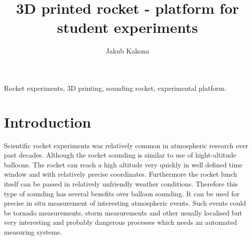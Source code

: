 \documentclass{poster16}
\begin{document}

%
\title{3D printed rocket - platform for student experiments}
%

%
\author{Jakub Kakona }
%


\maketitle


\begin{abstract}
\end{abstract}


\begin{keywords}
Rocket experiments, 3D printing, sounding rocket, experimental platform.
\end{keywords}


\section{Introduction}

Scientific rocket experiments was relatively common in atmospheric research over past decades. Although the rocket sounding is similar to use of hight-altitude balloons. The rocket can reach a high altitude very quickly in well defined time window and with relatively precise coordinates. Furthermore the rocket lunch itself can be passed in relatively unfriendly weather conditions. Therefore this type of sounding has several benefits over balloon sounding. It can be used for precise in situ measurement of interesting atmospheric events. Such events could be tornado measurements, storm measurements and other usually localised but very interesting and probably dangerous processes which needs an automated measuring systems. 
\end{document}

